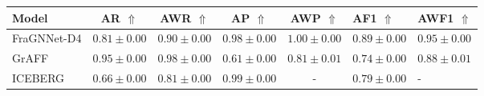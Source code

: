 \begin{tabular}{lcccc}
\toprule
Model & AR $\Uparrow$ & AWR $\Uparrow$ & AP $\Uparrow$ & AWP $\Uparrow$ & AF1 $\Uparrow$ & AWF1 $\Uparrow$ \\
\midrule
FraGNNet-D4 & $0.81 \pm 0.00$ & $0.90 \pm 0.00$ & $0.98 \pm 0.00$ & $1.00 \pm 0.00$ & $0.89 \pm 0.00$ & $0.95 \pm 0.00$ \\
GrAFF & $0.95 \pm 0.00$ & $0.98 \pm 0.00$ & $0.61 \pm 0.00$ & $0.81 \pm 0.01$ & $0.74 \pm 0.00$ & $0.88 \pm 0.01$ \\
ICEBERG & $0.66 \pm 0.00$ & $0.81 \pm 0.00$ & $0.99 \pm 0.00$ & - & $0.79 \pm 0.00$ & - \\
\bottomrule
\end{tabular}
